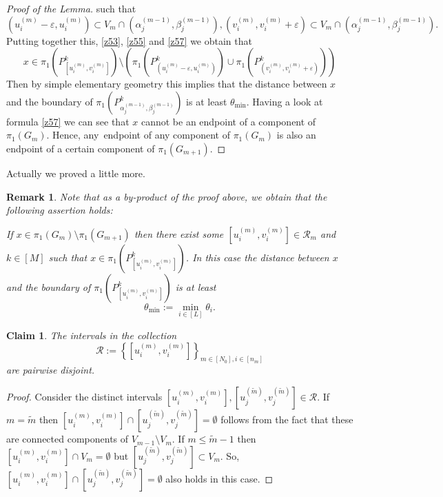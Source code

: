 \documentclass[amssymb,amsfonts,12pt,verbatim,righttag,oneside]{amsart}
\numberwithin{equation}{section} %
\theoremstyle{plain}
\newcommand{\fmu}{\ensuremath{\,}}
\theoremstyle{plain}
\newtheorem{claim}[theorem]{Claim}
\newtheorem{remark}[theorem]{Remark}
\begin{document}
\begin{proof}[Proof of the Lemma]
such that
\begin{equation}
\label{z54}
\left( u _{i}^{(m) }-\varepsilon ,u _{i}^{(m) } \right)\subset V_m
\cap
\left( \alpha _{j}^{(m-1) }, \beta _{j}^{(m-1) } \right)
,
\left( v_{i}^{(m)}, v_{i}^{(m)}+\varepsilon  \right)\subset V_m
\cap \left( \alpha _{j}^{(m-1) }, \beta _{j}^{(m-1) } \right).
\end{equation}
Putting together this, \eqref{z53}, \eqref{z55} and \eqref{z57} we obtain that
\begin{equation}
\label{z52}
x\in
\pi _1\left(
P _{\left[ u _{i}^{(m) },v _{i}^{(m) } \right]  }^{ k}\right)
\setminus
\left(
  \pi _1\left(  P _{ \left( u _{i}^{(m) }-\varepsilon ,u _{i}^{(m) } \right) }^{ k}\right)
\cup
\pi _1\left(
P _{\left( v_{i}^{(m)}, v_{i}^{(m)}+\varepsilon  \right) }^{ k}
 \right)\right)
\end{equation}
Then by simple elementary geometry this implies that the distance between $x$ and the boundary of $\pi _1 \left(P _{\alpha  _{j}^{(m-1)},\beta  _{j}^{(m-1) } }^{k } \right)$
is at least $\theta_{\min}$. Having a look at formula
\eqref{z57} we can see that $x$ cannot be an endpoint of
a component of $\pi _1(G_m)$. Hence,  any \fmu endpoint of any component of $\pi _1(G_m)$ is also an endpoint of a certain component of $\pi _1(G_{m+1})$.
\end{proof}
Actually we proved a little more.
\begin{remark}\label{z48}
  Note that as a by-product of the proof above, we obtain that the following assertion holds:

  If
$x\in \pi _1(G_{m})\setminus \pi _1(G_{m+1})$ then there exist some
$\left[ u _{i}^{(m) },v _{i}^{(m) } \right]\in\mathcal{R}_m$ and $k\in[M]$
such that
$x\in\pi _1\left( P _{ \left[ u _{i}^{(m) },v _{i}^{(m) } \right]  }^{k }\right)$. In this case the distance between $x$ and the boundary of
$\pi _1\left( P _{ \left[ u _{i}^{(m) },v _{i}^{(m) } \right]  }^{k }\right)$
is at least
$$
\theta_{\min}:=\min_{i\in [L]}\theta_i.
$$
\end{remark}
\begin{claim}\label{z51}
    The intervals in the collection
  $$
\mathcal{R}:=\left\{ \left[ u _{i}^{(m) },v _{i}^{(m) } \right] \right\}_{m\in[N_0],i\in[n_m]}
  $$
  are pairwise disjoint.
\end{claim}
\begin{proof}
Consider the distinct intervals $\left[ u _{i}^{(m) },v _{i}^{(m) } \right],
 \left[ u _{j}^{(\widetilde{m}) },v _{j}^{(\widetilde{m}) } \right]\in\mathcal{R}$. If $m=\widetilde{m}$ then $\left[ u _{i}^{(m) },v _{i}^{(m) } \right]\cap
 \left[ u _{j}^{(\widetilde{m}) },v _{j}^{(\widetilde{m}) } \right]=\emptyset  $
follows from the fact that these are connected components of
$V_{m-1}\setminus V_m$. If $m\leq\widetilde{m}-1$
then $\left[ u _{i}^{(m) },v _{i}^{(m) } \right]\cap V_m=\emptyset $ but
$\left[ u _{j}^{(\widetilde{m}) },v _{j}^{(\widetilde{m}) } \right]\subset V_m$. So, $\left[ u _{i}^{(m) },v _{i}^{(m) } \right]\cap
\left[ u _{j}^{(\widetilde{m}) },v _{j}^{(\widetilde{m}) } \right]=\emptyset  $
also {holds} in this case.
\end{proof}
\end{document}
